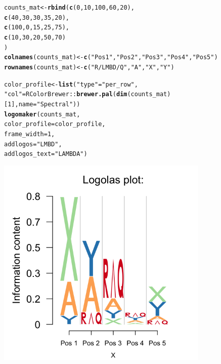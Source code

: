 \documentclass[12pt]{article}\usepackage[]{graphicx}\usepackage[usenames,dvipsnames]{color}
\makeatletter
\newcommand{\hlnum}[1]{\textcolor[rgb]{0.686,0.059,0.569}{#1}}%
\newcommand{\hlstr}[1]{\textcolor[rgb]{0.192,0.494,0.8}{#1}}%
\newcommand{\hlopt}[1]{\textcolor[rgb]{0,0,0}{#1}}%
\newcommand{\hlstd}[1]{\textcolor[rgb]{0.345,0.345,0.345}{#1}}%
\newcommand{\hlkwb}[1]{\textcolor[rgb]{0.69,0.353,0.396}{#1}}%
\newcommand{\hlkwc}[1]{\textcolor[rgb]{0.333,0.667,0.333}{#1}}%
\newcommand{\hlkwd}[1]{\textcolor[rgb]{0.737,0.353,0.396}{\textbf{#1}}}%
\newenvironment{kframe}{%
 \def\at@end@of@kframe{}%
 \ifinner\ifhmode%
  \def\at@end@of@kframe{\end{minipage}}%
  \begin{minipage}{\columnwidth}%
 \fi\fi%
 \def\FrameCommand##1{\hskip\@totalleftmargin \hskip-\fboxsep
 \colorbox{shadecolor}{##1}\hskip-\fboxsep
     \hskip-\linewidth \hskip-\@totalleftmargin \hskip\columnwidth}%
 \MakeFramed {\advance\hsize-\width
   \@totalleftmargin\z@ \linewidth\hsize
   \@setminipage}}%
 {\par\unskip\endMakeFramed%
 \at@end@of@kframe}
\newenvironment{knitrout}{}{} %
\makeatother
\begin{document}
\begin{figure}
\begin{center}
\begin{knitrout}
\color{fgcolor}\begin{kframe}
\begin{alltt}
\hlstd{counts_mat} \hlkwb{<-} \hlkwd{rbind}\hlstd{(}\hlkwd{c}\hlstd{(}\hlnum{0}\hlstd{,} \hlnum{10}\hlstd{,} \hlnum{100}\hlstd{,} \hlnum{60}\hlstd{,} \hlnum{20}\hlstd{),}
                    \hlkwd{c}\hlstd{(}\hlnum{40}\hlstd{,} \hlnum{30}\hlstd{,} \hlnum{30}\hlstd{,} \hlnum{35}\hlstd{,} \hlnum{20}\hlstd{),}
                    \hlkwd{c}\hlstd{(}\hlnum{100}\hlstd{,} \hlnum{0}\hlstd{,} \hlnum{15}\hlstd{,} \hlnum{25}\hlstd{,} \hlnum{75}\hlstd{),}
                    \hlkwd{c}\hlstd{(}\hlnum{10}\hlstd{,} \hlnum{30}\hlstd{,} \hlnum{20}\hlstd{,} \hlnum{50}\hlstd{,} \hlnum{70}\hlstd{)}
\hlstd{)}
\hlkwd{colnames}\hlstd{(counts_mat)} \hlkwb{<-} \hlkwd{c}\hlstd{(}\hlstr{"Pos 1"}\hlstd{,} \hlstr{"Pos 2"}\hlstd{,} \hlstr{"Pos 3"}\hlstd{,} \hlstr{"Pos 4"}\hlstd{,} \hlstr{"Pos 5"}\hlstd{)}
\hlkwd{rownames}\hlstd{(counts_mat)} \hlkwb{<-} \hlkwd{c}\hlstd{(}\hlstr{"R/LMBD/Q"}\hlstd{,} \hlstr{"A"}\hlstd{,} \hlstr{"X"}\hlstd{,} \hlstr{"Y"}\hlstd{)}

\hlstd{color_profile} \hlkwb{<-} \hlkwd{list}\hlstd{(}\hlstr{"type"} \hlstd{=} \hlstr{"per_row"}\hlstd{,}
                      \hlstr{"col"} \hlstd{= RColorBrewer}\hlopt{::}\hlkwd{brewer.pal}\hlstd{(}\hlkwd{dim}\hlstd{(counts_mat)[}\hlnum{1}\hlstd{],} \hlkwc{name} \hlstd{=} \hlstr{"Spectral"}\hlstd{))}
\hlkwd{logomaker}\hlstd{(counts_mat,}
          \hlkwc{color_profile} \hlstd{= color_profile,}
          \hlkwc{frame_width} \hlstd{=} \hlnum{1}\hlstd{,}
          \hlkwc{addlogos}\hlstd{=}\hlstr{"LMBD"}\hlstd{,}
          \hlkwc{addlogos_text}\hlstd{=}\hlstr{"LAMBDA"}\hlstd{)}
\end{alltt}
\end{kframe}
\includegraphics[width=4in,height=4in]{figure/new_string-1} 

\end{knitrout}
\end{center}
\end{figure}
\end{document}

